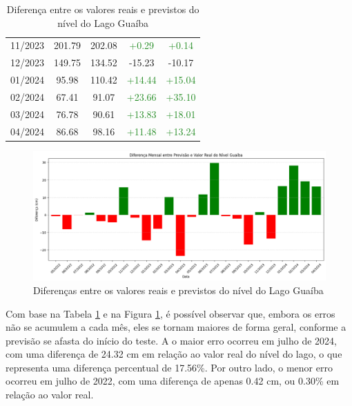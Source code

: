 \begin{table}[H]
\begin{tabular}{|c|c|c|c|c|}
11/2023 & 201.79 & 202.08 & \textcolor{ForestGreen}{+0.29} & \textcolor{ForestGreen}{+0.14} \\
12/2023 & 149.75 & 134.52 & \textcolor{BrickRed}{-15.23} & \textcolor{BrickRed}{-10.17} \\
01/2024 & 95.98 & 110.42 & \textcolor{ForestGreen}{+14.44} & \textcolor{ForestGreen}{+15.04} \\
02/2024 & 67.41 & 91.07 & \textcolor{ForestGreen}{+23.66} & \textcolor{ForestGreen}{+35.10} \\
03/2024 & 76.78 & 90.61 & \textcolor{ForestGreen}{+13.83} & \textcolor{ForestGreen}{+18.01} \\
04/2024 & 86.68 & 98.16 & \textcolor{ForestGreen}{+11.48} & \textcolor{ForestGreen}{+13.24} \\
\hline
\end{tabular}
\caption{Diferença entre os valores reais e previstos do nível do Lago Guaíba}
\label{tab:monthly_summary}
\end{table}

\begin{figure}[H]
	\caption{\label{fig:diferencas_previsao_lago_guaiba}Diferenças entre os valores reais e previstos do nível do Lago Guaíba}
	\begin{center}
		\includegraphics[scale=0.45]{figuras/diferencas_previsao_lago_guaiba.png}
	\end{center}
\end{figure}

Com base na Tabela \ref{tab:monthly_summary} e na Figura \ref{fig:diferencas_previsao_lago_guaiba}, é possível observar que, embora os erros não se acumulem a cada mês, eles se tornam maiores de forma geral, conforme a previsão se afasta do início do teste. A o maior erro ocorreu em julho de 2024, com uma diferença de 24.32 cm em relação ao valor real do nível do lago, o que representa uma diferença percentual de 17.56\%. Por outro lado, o menor erro ocorreu em julho de 2022, com uma diferença de apenas 0.42 cm, ou 0.30\% em relação ao valor real.

